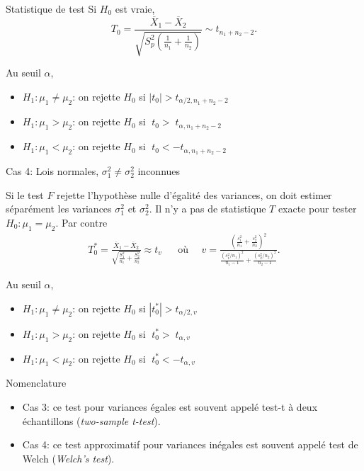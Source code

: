\documentclass{BeamerTemplate}
\begin{document}
\begin{frame}[t]{Statistique de test}
Si $H_0$ est vraie,
$$
T_0 = \frac{\overline{X}_1 - \overline{X}_2}{\sqrt{S_p^2 \left( \frac{1}{n_1} + \frac{1}{n_2} \right)} } \sim t_{n_1 + n_2 -2}.
$$

Au seuil $\alpha$,

\begin{itemize}\itemsep2mm
\item $H_1 : \mu_1 \ne \mu_2$: on rejette $H_0$ si $\left| t_0  \right|  > t_{\alpha/2, n_1+n_2-2}$
\item $H_1 : \mu_1 > \mu_2$: on rejette $H_0$ si $\;t_0   > \;t_{\alpha, n_1+n_2-2}$
\item $H_1 : \mu_1 < \mu_2$: on rejette $H_0$ si $\;t_0   < - t_{\alpha,n_1+n_2-2}$
\end{itemize}

\end{frame}

\begin{frame}[t]{Cas 4: Lois normales, $\sigma^2_1 \ne \sigma^2_2$ inconnues}

{\small 
Si le test $F$ \alert{rejette l'hypothèse nulle d'égalité des variances}, on doit estimer \alert{séparément} les variances $\sigma^2_1$ et $\sigma_2^2$.
Il n'y a pas de statistique $T$ exacte pour tester $H_0 : \mu_1 = \mu_2$.
Par contre
\begin{align*}
T_0^* = \frac{\overline{X}_1 - \overline{X}_2}{ \sqrt{ \frac{S^2_1}{n_1} + \frac{S^2_2}{n_2}  }} \approx t_v  & &
\mbox{o\`u }\quad v = \frac{\left( \frac{s_1^2}{n_1} + \frac{s_2^2}{n_2} \right) ^2 }{ \frac{ (s_1^2 / n_1)^2}{n_1 - 1} + \frac{ (s_2^2 / n_2)^2}{n_2 - 1}}.
\end{align*}

\medskip
Au seuil $\alpha$,

\begin{itemize}\itemsep2mm
\item $H_1 : \mu_1 \ne \mu_2$: on rejette $H_0$ si $\left| t_0^*  \right|  > t_{\alpha/2, v}$
\item $H_1 : \mu_1 > \mu_2$: on rejette $H_0$ si $\;t_0^*   > \;t_{\alpha,v}$
\item $H_1 : \mu_1 < \mu_2$: on rejette $H_0$ si $\;t_0^*   < - t_{\alpha,v}$
\end{itemize}
}
\end{frame}

\begin{frame}[t]{Nomenclature}

\begin{itemize}\itemsep1cm
\item Cas 3: ce test pour variances égales est souvent appelé \alert{test-t à deux échantillons} ({\it two-sample t-test}).
\item Cas 4: ce test approximatif pour variances inégales est souvent appelé \alert{test de Welch} ({\it Welch's test}).
\end{itemize}

\end{frame}
\end{document}
